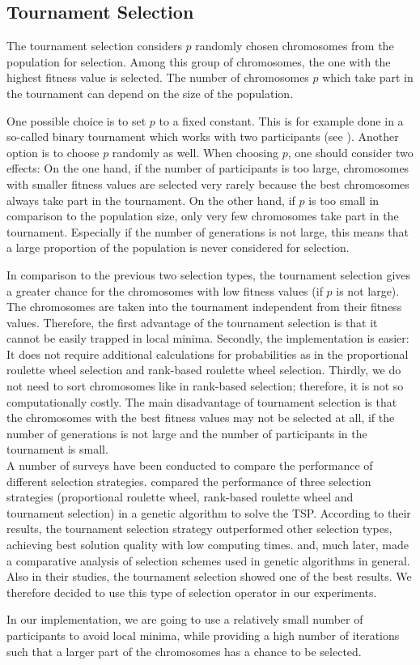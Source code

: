 \subsection{Tournament Selection}
\label{subsec:tournament}
The tournament selection considers $p$ randomly chosen chromosomes from the population for selection. Among this group of chromosomes, the one with the highest fitness value is selected. The number of chromosomes $p$ which take part in the tournament can depend on the size of the population. \par 
One possible choice is to set $p$ to a fixed constant. This is for example done in a so-called binary tournament which works with two participants (see \cite{goldberg1991comparative}). Another option is to choose $p$ randomly as well. When choosing $p$, one should consider two effects: On the one hand, if the number of participants is too large, chromosomes with smaller fitness values are selected very rarely because the best chromosomes always take part in the tournament. On the other hand, if $p$ is too small in comparison to the population size, only very few chromosomes take part in the tournament. Especially if the number of generations is not large, this means that a large proportion of the population is never considered for selection. \par
In comparison to the previous two selection types, the tournament selection gives a greater chance for the chromosomes with low fitness values (if $p$ is not large). The chromosomes are taken into the tournament independent from their fitness values. Therefore, the first advantage of the tournament selection is that it cannot be easily trapped in local minima. Secondly, the implementation is easier: It does not require additional calculations for probabilities as in the proportional roulette wheel selection and rank-based roulette wheel selection. Thirdly, we do not need to sort chromosomes like in rank-based selection; therefore, it is not so computationally costly. The main disadvantage of tournament selection is that the chromosomes with the best fitness values may not be selected at all, if the number of generations is not large and the number of participants in the tournament is small.\\ 

A number of surveys have been conducted to compare the performance of different selection strategies. \citeauthor{razali2011genetic} \cite{razali2011genetic} compared the performance of three selection strategies (proportional roulette wheel, rank-based roulette wheel and tournament selection) in a genetic algorithm to solve the TSP.  According to their results, the tournament selection strategy outperformed other selection types, achieving best solution quality with low computing times. \citeauthor{goldberg1991comparative} \cite{goldberg1991comparative} and, much later, \citeauthor{sharma2014analysis} \cite{sharma2014analysis} made a comparative analysis of selection schemes used in genetic algorithms in general. Also in their studies, the tournament selection showed one of the best results. We therefore decided to use this type of selection operator in our experiments.\par

In our implementation, we are going to use a relatively small number of participants to avoid local minima, while providing a high number of iterations such that a larger part of the chromosomes has a chance to be selected.\par